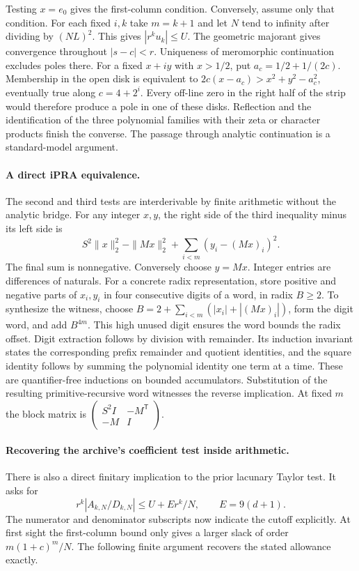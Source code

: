 Testing $x=e_0$ gives the first-column condition. Conversely, assume only that condition. For each fixed $i,k$ take $m=k+1$ and let $N$ tend to infinity after dividing by $(NL)^2$. This gives $|r^k u_k|\le U$. The geometric majorant gives convergence throughout $|s-c|<r$. Uniqueness of meromorphic continuation excludes poles there. For a fixed $x+iy$ with $x>1/2$, put $a_c=1/2+1/(2c)$. Membership in the open disk is equivalent to $2c(x-a_c)>x^2+y^2-a_c^2$, eventually true along $c=4+2^i$. Every off-line zero in the right half of the strip would therefore produce a pole in one of these disks. Reflection and the identification of the three polynomial families with their zeta or character products finish the converse. The passage through analytic continuation is a standard-model argument.

\paragraph{A direct iPRA equivalence.}
The second and third tests are interderivable by finite arithmetic without the analytic bridge. For any integer $x,y$, the right side of the third inequality minus its left side is
\[
   S^2\|x\|_2^2-\|Mx\|_2^2+\sum_{i<m}(y_i-(Mx)_i)^2.
\]
The final sum is nonnegative. Conversely choose $y=Mx$. Integer entries are differences of naturals. For a concrete radix representation, store positive and negative parts of $x_i,y_i$ in four consecutive digits of a word, in radix $B\ge2$. To synthesize the witness, choose $B=2+\sum_{i<m}(|x_i|+|(Mx)_i|)$, form the digit word, and add $B^{4m}$. This high unused digit ensures the word bounds the radix offset. Digit extraction follows by division with remainder. Its induction invariant states the corresponding prefix remainder and quotient identities, and the square identity follows by summing the polynomial identity one term at a time. These are quantifier-free inductions on bounded accumulators. Substitution of the resulting primitive-recursive word witnesses the reverse implication. At fixed $m$ the block matrix is $\left(\begin{smallmatrix}S^2 I&-M^{\mathsf T}\\-M&I\end{smallmatrix}\right)$.

\paragraph{Recovering the archive's coefficient test inside arithmetic.}
There is also a direct finitary implication to the prior lacunary Taylor test. It asks for
\[
  r^k |A_{k,N}/D_{k,N}|\le U+Er^k/N,\qquad E=9(d+1).
\]
The numerator and denominator subscripts now indicate the cutoff explicitly. At first sight the first-column bound only gives a larger slack of order $m(1+c)^m/N$. The following finite argument recovers the stated allowance exactly.

